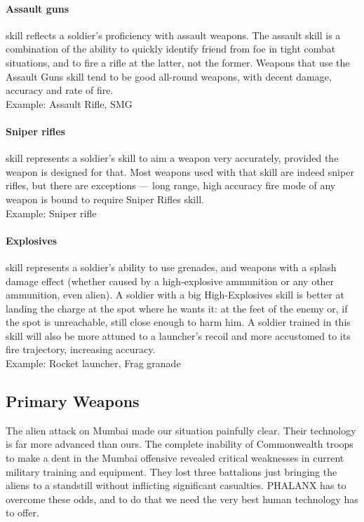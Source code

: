 \paragraph*{Assault guns}
 skill reflects a soldier's proficiency with assault weapons. The assault skill is a combination of the ability to quickly identify friend from foe in tight combat situations, and to fire a rifle at the latter, not the former. Weapons that use the Assault Guns skill tend to be good all-round weapons, with decent damage, accuracy and rate of fire.\\
Example: Assault Rifle, SMG
\paragraph*{Sniper rifles}
 skill represents a soldier's skill to aim a weapon very accurately, provided the weapon is designed for that. Most weapons used with that skill are indeed sniper rifles, but there are exceptions --- long range, high accuracy fire mode of any weapon is bound to require Sniper Rifles skill.\\
Example: Sniper rifle
\paragraph*{Explosives}
 skill represents a soldier's ability to use grenades, and weapons with a splash damage effect (whether caused by a high-explosive ammunition or any other ammunition, even alien). A soldier with a big High-Explosives skill is better at landing the charge at the spot where he wants it: at the feet of the enemy or, if the spot is unreachable, still close enough to harm him. A soldier trained in this skill will also be more attuned to a launcher's recoil and more accustomed to its fire trajectory, increasing accuracy.\\
Example: Rocket launcher, Frag granade

\newpage

\subsection{Primary Weapons}
The alien attack on Mumbai made our situation painfully clear. Their technology is far more advanced than ours. The complete inability of Commonwealth troops to make a dent in the Mumbai offensive revealed critical weaknesses in current military training and equipment. They lost three battalions just bringing the aliens to a standstill without inflicting significant casualties. PHALANX has to overcome these odds, and to do that we need the very best human technology has to offer.

